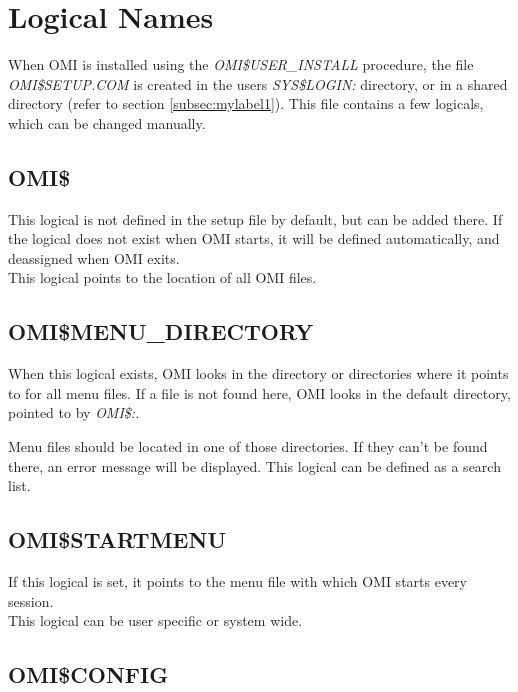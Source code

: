 \documentclass[a4paper]{book}
\newcommand{\vs}{\vspace{3mm}}
\begin{document}
\section{Logical Names}
\label{subsec:logical}

When OMI is installed using the \textsl{OMI{\$}USER{\_}INSTALL} procedure, the file 
\textsl{OMI{\$}SETUP.COM} is created in the users \textsl{SYS{\$}LOGIN:} directory, or in a 
shared directory (refer to section \ref{subsec:mylabel1}). This file 
contains a few logicals, which can be changed manually.

\subsection{OMI{\$}}
\label{subsubsec:mylabel12}

This logical is not defined in the setup file by default, but can be added 
there. If the logical does not exist when OMI starts, it will be defined 
automatically, and deassigned when OMI exits. \\
This logical points to the location of all OMI files.

\subsection{OMI{\$}MENU{\_}DIRECTORY}
\label{subsubsec:mylabel13}

When this logical exists, OMI looks in the directory or directories where it 
points to for all menu files. If a file is not found here, OMI looks in the 
default directory, pointed to by \textsl{OMI{\$}:}.

\vs

Menu files should be located in one of those directories. If they can't be 
found there, an error message will be displayed. This logical can be defined 
as a search list.

\subsection{OMI{\$}STARTMENU}
\label{subsubsec:mylabel14}

If this logical is set, it points to the menu file with which OMI starts 
every session. \\
This logical can be user specific or system wide.

\subsection{OMI{\$}CONFIG}
\label{subsubsec:mylabel15}
\end{document}
